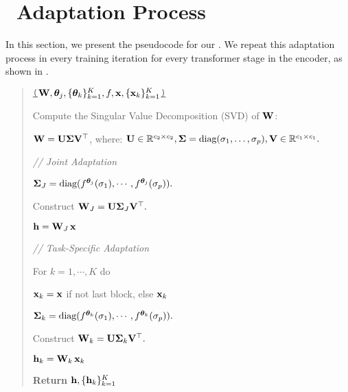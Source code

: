  \appendix
\clearpage
\setcounter{page}{1}
\maketitlesupplementary

\section{\ourmethod\ Adaptation Process}
In this section, we present the pseudocode for our \ourmethod. We repeat this adaptation process in every training iteration for every transformer stage in the encoder, as shown in .
\begin{quote} %
\noindent\texttt{\underline{\ourmethod(${\mathbf{W}}, {\bm{\theta}}_j, \{{\bm{\theta}}_k\}_{k=1}^K, f, {\mathbf{x}}, \{{\mathbf{x}}_k\}_{k=1}^K$)}}
\begin{steps}
    \item Compute the Singular Value Decomposition (SVD) of \( {\mathbf{W}} \):
    \begin{steps}
        \item \( {\mathbf{W}} = {\mathbf{U}} \mathbf{\Sigma} {\mathbf{V}}^\top \), where:
         \( {\mathbf{U}} \in \mathbb{R}^{c_2 \times c_2}, \mathbf{\Sigma} = \text{diag}(\sigma_1, \ldots, \sigma_p), {\mathbf{V}} \in \mathbb{R}^{c_1 \times c_1}. \)
    \end{steps}
    \item[\textit{//}] \textit{Joint Adaptation}
    \item  \( \mathbf{\Sigma}_J = \text{diag}(f^{{\bm{\theta}}_j}(\sigma_1), \cdots, f^{{\bm{\theta}}_j}(\sigma_p)). \)
    \item Construct \( {\mathbf{W}}_J = {\mathbf{U}} \mathbf{\Sigma}_J {\mathbf{V}}^\top. \)
    \item ${\mathbf{h}} = {\mathbf{W}}_J \, {\mathbf{x}}$
    \item[\textit{//}] \textit{Task-Specific Adaptation}
    \item For $k = 1, \cdots, K$ do
    \begin{steps}
            \item ${\mathbf{x}}_k = {\mathbf{x}}$ if not last block, else ${\mathbf{x}}_k$
            \item \( \mathbf{\Sigma}_k = \text{diag}(f^{{\bm{\theta}}_k}(\sigma_1), \cdots, f^{{\bm{\theta}}_k}(\sigma_p)). \)
            \item Construct \( {\mathbf{W}}_k = {\mathbf{U}} \mathbf{\Sigma}_k {\mathbf{V}}^\top. \)
            \item ${\mathbf{h}}_k = {\mathbf{W}}_k\,{\mathbf{x}}_k$
    \end{steps}
    \item \textbf{Return} ${\mathbf{h}}, \{{\mathbf{h}}_k\}_{k=1}^K$
\end{steps}
\end{quote}


